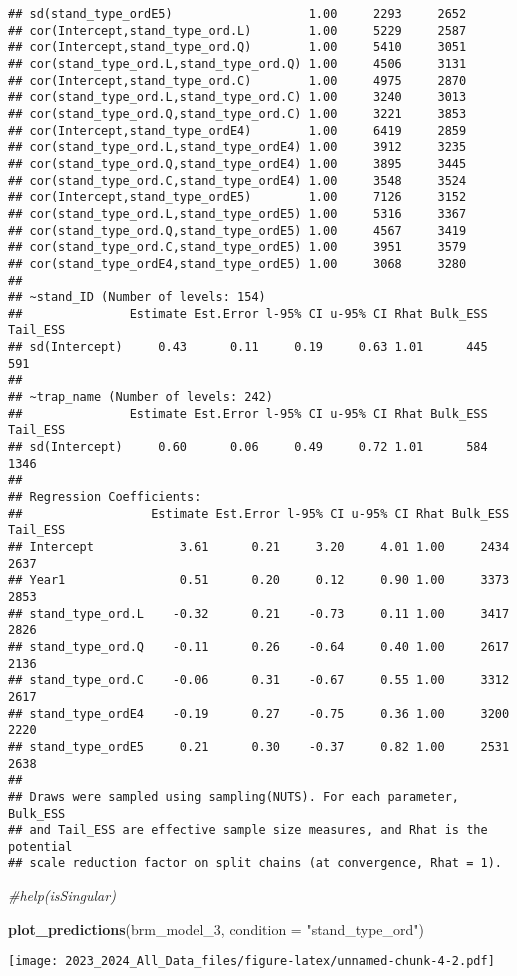 \documentclass[
]{article}
\newenvironment{Shaded}{\begin{snugshade}}{\end{snugshade}}
\newcommand{\AttributeTok}[1]{\textcolor[rgb]{0.13,0.29,0.53}{#1}}
\newcommand{\CommentTok}[1]{\textcolor[rgb]{0.56,0.35,0.01}{\textit{#1}}}
\newcommand{\FunctionTok}[1]{\textcolor[rgb]{0.13,0.29,0.53}{\textbf{#1}}}
\newcommand{\NormalTok}[1]{#1}
\newcommand{\StringTok}[1]{\textcolor[rgb]{0.31,0.60,0.02}{#1}}
\begin{document}
\begin{verbatim}
## sd(stand_type_ordE5)                   1.00     2293     2652
## cor(Intercept,stand_type_ord.L)        1.00     5229     2587
## cor(Intercept,stand_type_ord.Q)        1.00     5410     3051
## cor(stand_type_ord.L,stand_type_ord.Q) 1.00     4506     3131
## cor(Intercept,stand_type_ord.C)        1.00     4975     2870
## cor(stand_type_ord.L,stand_type_ord.C) 1.00     3240     3013
## cor(stand_type_ord.Q,stand_type_ord.C) 1.00     3221     3853
## cor(Intercept,stand_type_ordE4)        1.00     6419     2859
## cor(stand_type_ord.L,stand_type_ordE4) 1.00     3912     3235
## cor(stand_type_ord.Q,stand_type_ordE4) 1.00     3895     3445
## cor(stand_type_ord.C,stand_type_ordE4) 1.00     3548     3524
## cor(Intercept,stand_type_ordE5)        1.00     7126     3152
## cor(stand_type_ord.L,stand_type_ordE5) 1.00     5316     3367
## cor(stand_type_ord.Q,stand_type_ordE5) 1.00     4567     3419
## cor(stand_type_ord.C,stand_type_ordE5) 1.00     3951     3579
## cor(stand_type_ordE4,stand_type_ordE5) 1.00     3068     3280
## 
## ~stand_ID (Number of levels: 154) 
##               Estimate Est.Error l-95% CI u-95% CI Rhat Bulk_ESS Tail_ESS
## sd(Intercept)     0.43      0.11     0.19     0.63 1.01      445      591
## 
## ~trap_name (Number of levels: 242) 
##               Estimate Est.Error l-95% CI u-95% CI Rhat Bulk_ESS Tail_ESS
## sd(Intercept)     0.60      0.06     0.49     0.72 1.01      584     1346
## 
## Regression Coefficients:
##                  Estimate Est.Error l-95% CI u-95% CI Rhat Bulk_ESS Tail_ESS
## Intercept            3.61      0.21     3.20     4.01 1.00     2434     2637
## Year1                0.51      0.20     0.12     0.90 1.00     3373     2853
## stand_type_ord.L    -0.32      0.21    -0.73     0.11 1.00     3417     2826
## stand_type_ord.Q    -0.11      0.26    -0.64     0.40 1.00     2617     2136
## stand_type_ord.C    -0.06      0.31    -0.67     0.55 1.00     3312     2617
## stand_type_ordE4    -0.19      0.27    -0.75     0.36 1.00     3200     2220
## stand_type_ordE5     0.21      0.30    -0.37     0.82 1.00     2531     2638
## 
## Draws were sampled using sampling(NUTS). For each parameter, Bulk_ESS
## and Tail_ESS are effective sample size measures, and Rhat is the potential
## scale reduction factor on split chains (at convergence, Rhat = 1).
\end{verbatim}

\begin{Shaded}
\begin{Highlighting}[]
\CommentTok{\#help(\textquotesingle{}isSingular\textquotesingle{})}

\FunctionTok{plot\_predictions}\NormalTok{(brm\_model\_3, }\AttributeTok{condition =} \StringTok{"stand\_type\_ord"}\NormalTok{)}
\end{Highlighting}
\end{Shaded}

\texttt{[image: 2023\_2024\_All\_Data\_files/figure-latex/unnamed-chunk-4-2.pdf]}
\end{document}
